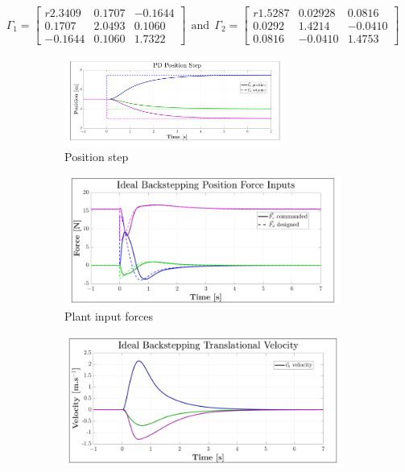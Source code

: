 \begin{equation}\label{eq:optimized-Position-IBC}
\Gamma_1 = \begin{bmatrix*}{r}
2.3409 & 0.1707 & -0.1644\\
0.1707 & 2.0493 & 0.1060\\
-0.1644 & 0.1060 & 1.7322
\end{bmatrix*}
~~\text{and}~~\Gamma_2= \begin{bmatrix*}{r}
1.5287 & 0.02928 & 0.0816\\
0.0292 & 1.4214 & -0.0410\\
0.0816 & -0.0410 & 1.4753
\end{bmatrix*}
\end{equation}
\par
\begin{figure}[hbtp]
\vspace{-15pt}
\centering
\begin{subfigure}{\textwidth}
\centering
\includegraphics[width=0.8\textwidth]{graphs/IBC_Position_Step}
\caption{Position step}
\label{fig:IBC_Position_Step}
\end{subfigure}
\begin{subfigure}{0.49\textwidth}
\centering
\includegraphics[width=\textwidth]{graphs/IBC_Position_Force}
\caption{Plant input forces}
\label{fig:IBC_Position_Force}
\end{subfigure}
\begin{subfigure}{0.49\textwidth}
\centering
\includegraphics[width=\textwidth]{graphs/IBC_Position_Velocity}

\end{subfigure}
\end{figure}

